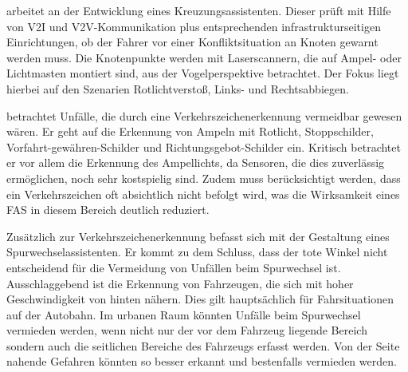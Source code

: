 \Textcite[S. 2]{Schendzielorz.21.09.2016} arbeitet an der Entwicklung eines Kreuzungsassistenten. Dieser prüft mit Hilfe von \ac{V2I} und \ac{V2V}-Kommunikation plus entsprechenden infrastrukturseitigen Einrichtungen, ob der Fahrer vor einer Konfliktsituation an Knoten gewarnt werden muss. Die Knotenpunkte werden mit Laserscannern, die auf Ampel- oder Lichtmasten montiert sind, aus der Vogelperspektive betrachtet. Der Fokus liegt hierbei auf den Szenarien Rotlichtverstoß, Links- und Rechtsabbiegen.

\Textcite[S. 224-230]{Grundl.2005} betrachtet Unfälle, die durch eine Verkehrszeichenerkennung vermeidbar gewesen wären. Er geht auf die Erkennung von Ampeln mit Rotlicht, Stoppschilder, Vorfahrt-gewähren-Schilder und Richtungsgebot-Schilder ein. Kritisch betrachtet er vor allem die Erkennung des Ampellichts, da Sensoren, die dies zuverlässig ermöglichen, noch sehr kostspielig sind. Zudem muss berücksichtigt werden, dass ein Verkehrszeichen oft absichtlich nicht befolgt wird, was die Wirksamkeit eines \ac{FAS} in diesem Bereich deutlich reduziert.

Zusätzlich zur Verkehrszeichenerkennung befasst sich \Textcite[S. 239-246]{Grundl.2005} mit der Gestaltung eines Spurwechselassistenten. Er kommt zu dem Schluss, dass der tote Winkel nicht entscheidend für die Vermeidung von Unfällen beim Spurwechsel ist. Ausschlaggebend ist die Erkennung von Fahrzeugen, die sich mit hoher Geschwindigkeit von hinten nähern. Dies gilt hauptsächlich für Fahrsituationen auf der Autobahn. Im urbanen Raum könnten Unfälle beim Spurwechsel vermieden werden, wenn nicht nur der vor dem Fahrzeug liegende Bereich sondern auch die seitlichen Bereiche des Fahrzeugs erfasst werden. Von der Seite nahende Gefahren könnten so besser erkannt und bestenfalls vermieden werden.

